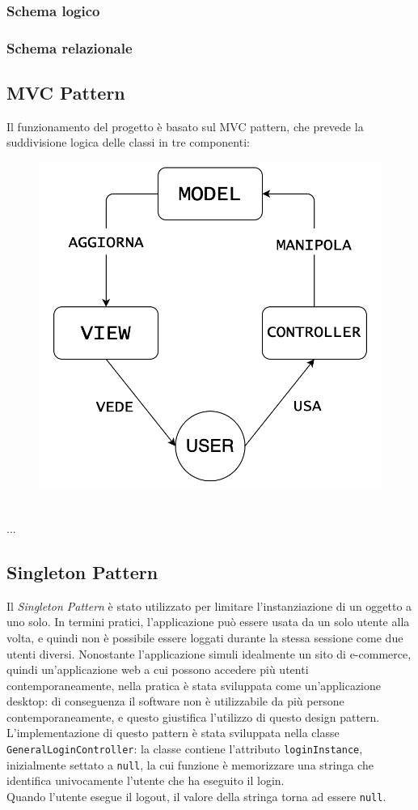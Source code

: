 \documentclass[12pt,a4paper]{article}
\begin{document}
	\subsubsection{Schema logico}
	\subsubsection{Schema relazionale}
	\subsection{MVC Pattern}
	Il funzionamento del progetto è basato sul MVC pattern, che prevede la suddivisione logica delle classi in tre componenti:
	\begin{figure}[h!]
		\centering
		\includegraphics[scale=0.4]{images/MVCPattern.png}
	\end{figure}\\
	...
	\subsection{Singleton Pattern}
	Il \textit{Singleton Pattern} è stato utilizzato per limitare l'instanziazione di un oggetto a uno solo. In termini pratici, l'applicazione può essere usata da un solo utente alla volta, e quindi non è possibile essere loggati durante la stessa sessione come due utenti diversi. Nonostante l'applicazione simuli idealmente un sito di e-commerce, quindi un'applicazione web a cui possono accedere più utenti contemporaneamente, nella pratica è stata sviluppata come un'applicazione desktop: di conseguenza il software non è utilizzabile da più persone contemporaneamente, e questo giustifica l'utilizzo di questo design pattern.
	L'implementazione di questo pattern è stata sviluppata nella classe \texttt{GeneralLoginController}: la classe contiene l'attributo \texttt{loginInstance}, inizialmente settato a \texttt{null}, la cui funzione è memorizzare una stringa che identifica univocamente l'utente che ha eseguito il login.\\
	Quando l'utente esegue il logout, il valore della stringa torna ad essere \texttt{null}.\\
\end{document}
